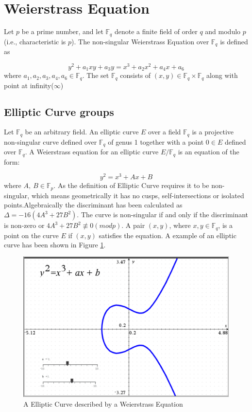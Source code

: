 \documentclass[a4paper,12pt]{report}
\begin{document}
\section{Weierstrass Equation}
Let $p$ be a prime number, and let $\mathbb{F}_q$ denote a finite
field of order $q$ and modulo $p$ (i.e., characteristic is $p$). The
non-singular Weierstrass Equation over $\mathbb{F}_q$ is defined as

\begin{equation}
y^{2} + a_{1}xy + a_{3}y = x^{3} +a_{2}x^{2} +a_{4}x + a_6
\end{equation}
where $a_{1}, a_{2}, a_{3}, a_{4}, a_{6} \in \mathbb{F}_q$. The set
$\mathbb{F}_q$ consists of $(x, y) \in \mathbb{F}_q \times
\mathbb{F}_q$ along with point at infinity($\infty$)
\cite{washington}


\subsection{Elliptic Curve groups}
Let $\mathbb{F}_q$ be an arbitrary field. An elliptic curve $E$ over a field $\mathbb{F}_q$
is a projective non-singular curve defined over $\mathbb{F}_q$ of genus 1 together with a
point $0\in E$ defined over $\mathbb{F}_q$. A Weierstrass equation for an elliptic curve
$E/\mathbb{F}_q$ is an equation of the form:

\begin{equation}
y^{2} = x^{3} + Ax + B
\end{equation}
where $A, \  B \in \mathbb{F}_p$. As the definition of Elliptic
Curve requires it to be non-singular, which means geometrically it
has no cusps, self-intersections or isolated points.Algebraically
the discriminant has been calculated as $\Delta = -16(4A^3 +27B^2)$.
The curve is non-singular if and only if the discriminant is
non-zero or $4A^3 +27B^2 \not\equiv 0 (mod p)$. A pair $(x, y)$,
where $x, y \in \mathbb{F}_q$, is a point on the curve $E$ if $(x,
y)$ satisfies the equation. A example of an elliptic curve has been
shown in Figure \ref{KK}.

\begin{figure}
\begin{center}
\includegraphics[scale=0.5]{./ec1}
\end{center}
\caption{A Elliptic Curve described by a Weierstrass Equation}
\label{KK}
\end{figure}
\end{document}
